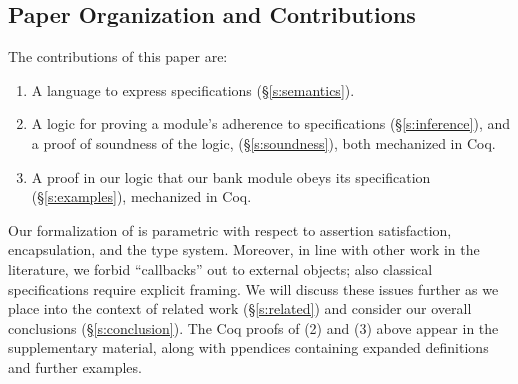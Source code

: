 \subsection{Paper Organization and Contributions}


%
The contributions of this paper are:\begin{enumerate}
 \item
A language to
express \Nec specifications (\S\ref{s:semantics}).

 \item
A logic for proving a module's adherence to 
 \Nec specifications (\S\ref{s:inference}), and a proof of soundness of the logic, (\S\ref{s:soundness}),
both mechanized in Coq. 
 \item
A proof in our logic %
  that our bank module obeys its \Nec specification (\S\ref{s:examples}),  mechanized in Coq.
\end{enumerate}



Our formalization of \Nec %
{  is 
parametric} with respect to assertion
satisfaction, encapsulation, and the type system.
{{Moreover, in line} with other work in the literature,} we forbid 
``callbacks'' out to external objects; also %
classical specifications require explicit framing.
We will discuss these  issues %
further as we place \Nec into the context of 
related work (\S\ref{s:related}) and consider our overall conclusions
(\S\ref{s:conclusion}). 
%
The Coq proofs of 
(2) and (3) above appear in the
supplementary material, along with ppendices containing expanded 
definitions and further examples.

